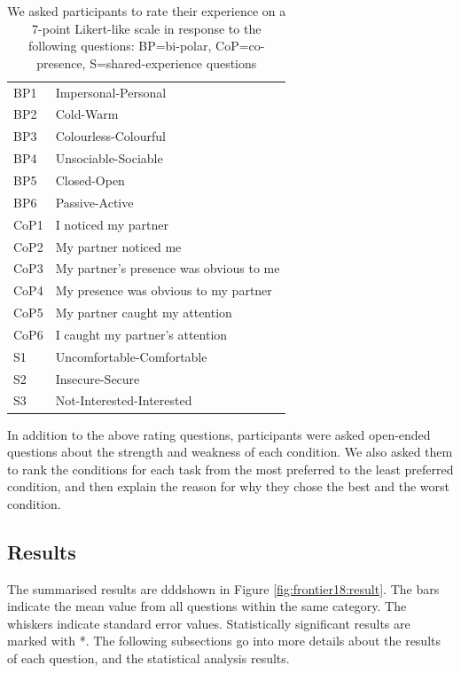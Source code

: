 \begin{table}
    \centering
    \caption{We asked participants to rate their experience on a 7-point Likert-like scale in response to the following questions: BP=bi-polar, CoP=co-presence, S=shared-experience questions}
    \begin{tabular}{ll}
BP1 &    Impersonal-Personal\\
BP2 &    Cold-Warm\\
BP3 &    Colourless-Colourful\\
BP4 &    Unsociable-Sociable\\
BP5 &    Closed-Open\\
BP6 &    Passive-Active\\
CoP1    &   I noticed my partner\\
CoP2    &   My partner noticed me\\
CoP3    &   My partner's presence was obvious to me\\
CoP4    &   My presence was obvious to my partner\\
CoP5    &   My partner caught my attention \\
CoP6    &   I caught my partner's attention\\
S1  & Uncomfortable-Comfortable\\
S2  & Insecure-Secure\\
S3  & Not-Interested-Interested\\
    \end{tabular}
    \label{tab:frontier:questions}
\end{table}

In addition to the above rating questions, participants were asked open-ended questions about the strength and weakness of each condition. We also asked them to rank the conditions for each task from the most preferred to the least preferred condition, and then explain the reason for why they chose the best and the worst condition. 

\subsection{Results}


The summarised results are dddshown in Figure \ref{fig:frontier18:result}. The bars indicate the mean value from all questions within the same category. The whiskers indicate standard error values. Statistically significant results are marked with *. The following subsections go into more details about the results of each question, and the statistical analysis results.

